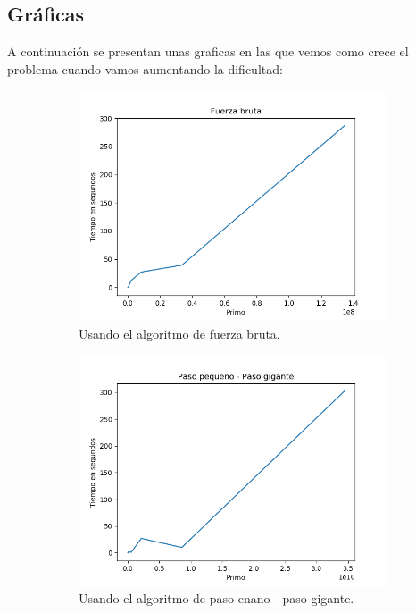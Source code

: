 \documentclass[12pt,spanish]{article}
\begin{document}
	\subsection{Gráficas}
		A continuación se presentan unas graficas en las que vemos como crece el problema cuando vamos aumentando la dificultad: 
		\begin{figure}[!htbp]
			
			\begin{subfigure}{.5\textwidth}
				\centering
				\includegraphics[width=.8\linewidth]{log_bf}
				\caption{Usando el algoritmo de fuerza bruta.}
				\label{fig:sfig11}
			\end{subfigure}%
			\begin{subfigure}{.5\textwidth}
				\centering
				\includegraphics[width=.8\linewidth]{log_pe}
				\caption{Usando el algoritmo de paso enano - paso gigante.}
				\label{fig:sfig12}
			\end{subfigure}
			\begin{subfigure}{.5\textwidth}
				\centering

\end{subfigure}
\end{figure}
\end{document}
